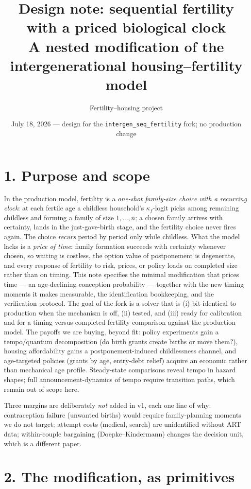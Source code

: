 \documentclass[11pt]{article}
\title{\vspace{-1.4em}\textbf{Design note: sequential fertility with a priced biological clock}\\[2pt]
\large A nested modification of the intergenerational housing--fertility model}
\author{Fertility--housing project}
\date{July 18, 2026 --- design for the \texttt{intergen\_seq\_fertility} fork; no production change}
\begin{document}
\maketitle
\vspace{-1.4em}

\section*{1. Purpose and scope}

In the production model, fertility is a \emph{one-shot family-size choice
with a recurring clock}: at each fertile age a childless household's
$\kappa_f$-logit picks among remaining childless and forming a family of
size $1,\dots,\bar n$; a chosen family arrives with certainty, lands in the
just-gave-birth stage, and the fertility choice never fires again. The
choice \emph{recurs} period by period only while childless. What the model
lacks is a \emph{price of time}: family formation succeeds with certainty
whenever chosen, so waiting is costless, the option value of postponement is
degenerate, and every response of fertility to risk, prices, or policy loads
on completed size rather than on timing. This note specifies the minimal
modification that prices time --- an age-declining conception probability
--- together with the new timing moments it makes measurable, the
identification bookkeeping, and the verification protocol. The goal of the
fork is a solver that is (i) bit-identical to production when the mechanism
is off, (ii) tested, and (iii) ready for calibration and for a
timing-versus-completed-fertility comparison against the production model.
The payoffs we are buying, beyond fit: policy experiments gain a
tempo/quantum decomposition (do birth grants create births or move them?),
housing affordability gains a postponement-induced childlessness channel,
and age-targeted policies (grants by age, entry-debt relief) acquire an
economic rather than mechanical age profile. Steady-state comparisons reveal
tempo in hazard shapes; full announcement-dynamics of tempo require
transition paths, which remain out of scope here.

Three margins are deliberately \emph{not} added in v1, each one line of why:
contraception failure (unwanted births) would require family-planning
moments we do not target; attempt costs (medical, search) are unidentified
without ART data; within-couple bargaining (Doepke--Kindermann) changes the
decision unit, which is a different paper.

\section*{2. The modification, as primitives}
\end{document}
